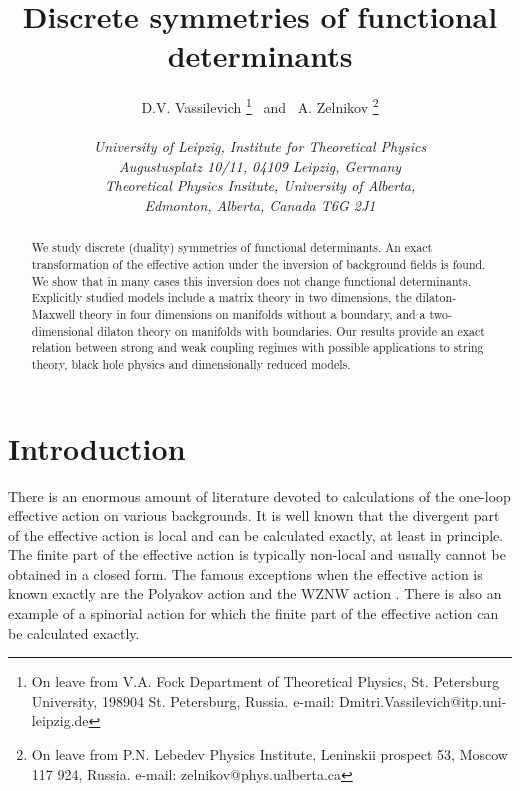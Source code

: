 \documentclass[a4paper,12pt]{article}
\begin{document}
\title{\bf Discrete symmetries of functional determinants}

\author{	  D.V. Vassilevich \coordHE{}\thanks{On leave from V.A. Fock
		Department of Theoretical Physics,
     		St. Petersburg University,
     		198904 St. Petersburg, Russia.
     		e-mail: Dmitri.Vassilevich@itp.uni-leipzig.de} 
     ~and~ 
     		A. Zelnikov \coordHE{}\thanks{On leave from 
		P.N. Lebedev Physics Institute,
		Leninskii prospect 53, Moscow 117 924, Russia. e-mail:
		zelnikov@phys.ualberta.ca}  \\ {}\\
     {\coordHE{}\small\it University of Leipzig, Institute 
     for Theoretical Physics}\\
{\small \it  Augustusplatz 10/11, 04109 Leipzig, Germany}\\ 
{\coordHE{}\small\it Theoretical 
Physics Insitute, University of Alberta,}\\
{\small \it Edmonton, Alberta, Canada T6G 2J1}}
\maketitle

\begin{abstract}
We study discrete (duality) symmetries of functional determinants.
An exact transformation of the effective action under the inversion 
of background fields \coordHE{} is found. We show 
that in many cases this inversion does not change functional 
determinants. Explicitly studied models include a matrix theory in 
two dimensions, the dilaton-Maxwell theory in four dimensions on 
manifolds without a boundary, and a two-dimensional dilaton theory 
on manifolds with boundaries. Our results provide an exact relation 
between strong and weak coupling regimes with possible applications 
to string theory, black hole physics and dimensionally reduced models.
\end{abstract}
\section{Introduction}
There is an enormous amount of literature devoted to
calculations of the one-loop effective action on various
backgrounds. It is well known that the divergent part of the
effective action is local and can be calculated exactly, at
least in principle. The finite part of the effective action
is typically non-local and usually cannot be obtained in
a closed form. The famous exceptions when the effective
action is known exactly are the Polyakov action \cite{Polyakov}
and the WZNW action \cite{Witten84,Novikov82}. There is also an example
of a spinorial action \cite{Kummer:1999dc} for which 
the finite part of the effective action can be 
calculated exactly. 
\end{document}
